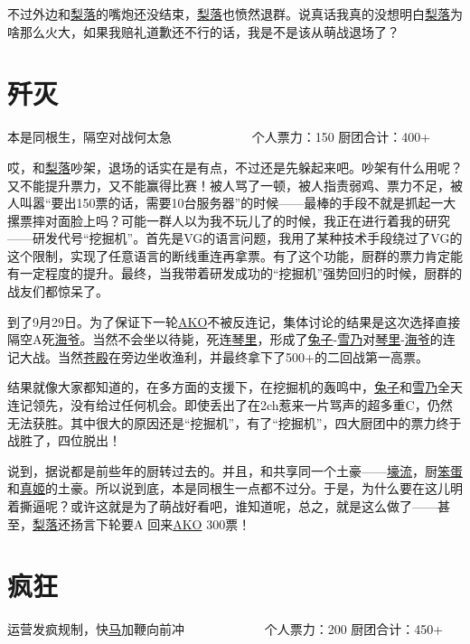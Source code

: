 不过外边和\uline{梨落}的嘴炮还没结束，\uline{梨落}也愤然退群。说真话我真的没想明白\uline{梨落}为啥那么火大，如果我赔礼道歉还不行的话，我是不是该从萌战退场了？

\chapter{歼灭}
\begin{center}
{\subTitle {}本是同根生，隔空对战何太急}
\subMemo
　　　　　　个人票力：150 厨团合计：400+
\end{center}

哎，和\uline{梨落}吵架，退场的话实在是有点，不过还是先躲起来吧。吵架有什么用呢？又不能提升票力，又不能赢得比赛！被人骂了一顿，被人指责弱鸡、票力不足，被人叫嚣“要出150票的话，需要10台服务器”的时候——最棒的手段不就是抓起一大摞票摔对面脸上吗？可能一群人以为我不玩儿了的时候，我正在进行着我的研究——研发代号“挖掘机”。首先是VG的语言问题，我用了某种技术手段绕过了VG的这个限制，实现了任意语言的断线重连再拿票。有了这个功能，厨群的票力肯定能有一定程度的提升。最终，当我带着研发成功的“挖掘机”强势回归的时候，厨群的战友们都惊呆了。

到了9月29日。为了保证下一轮\uline{AKO}不被反连记，集体讨论的结果是这次选择直接隔空A死\uline{海爷}。当然不会坐以待毙，死连\uline{琴里}，形成了\uline{兔子}-\uline{雪乃}对\uline{琴里}-\uline{海爷}的连记大战。当然\uline{苍殿}在旁边坐收渔利，并最终拿下了500+的二回战第一高票。

结果就像大家都知道的，在多方面的支援下，在挖掘机的轰鸣中，\uline{兔子}和\uline{雪乃}全天连记领先，没有给过任何机会。即使丢出了在2ch惹来一片骂声的超多重C，仍然无法获胜。其中很大的原因还是“挖掘机”，有了“挖掘机”，四大厨团中的票力终于战胜了，四位脱出！

说到，据说都是前些年的厨转过去的。并且，和共享同一个土豪——\uline{壕流}，厨\uline{笨蛋}和\uline{真姬}的土豪。所以说到底，本是同根生一点都不过分。于是，为什么要在这儿明着撕逼呢？或许这就是为了萌战好看吧，谁知道呢，总之，就是这么做了——甚至，\uline{梨落}还扬言下轮要A 回来\uline{AKO} 300票！

\chapter{疯狂}
\begin{center}
{\subTitle 运营发疯规制，快\uline{马}加鞭向前冲}
\subMemo
　　　　　　个人票力：200 厨团合计：450+
\end{center}


